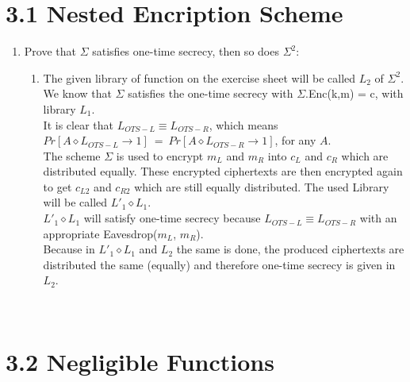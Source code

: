 \documentclass{report}
\begin{document}
	\pagestyle{fancy}
	
	\section*{3.1 Nested Encription Scheme}
	\begin{enumerate}[]
		\item Prove that $\Sigma$ satisfies one-time secrecy, then so does $\Sigma ^2$:
		\begin{enumerate}[]
			\item The given library of function on the exercise sheet will be called $L_2$ of $\Sigma ^2$. \\
			We know that $\Sigma$ satisfies the one-time secrecy with $\Sigma$.Enc(k,m) = c, with library $L_1$. \\
			It is clear that $L_{OTS-L} \equiv L_{OTS-R}$, which means $Pr[A \diamond L_{OTS-L} \rightarrow 1] \ = \ Pr[A \diamond L_{OTS-R} \rightarrow 1]$, for any $A$. \\
			The scheme $\Sigma$ is used to encrypt $m_L$ and $m_R$ into $c_L$ and $c_R$ which are distributed equally. These encrypted ciphertexts are then encrypted again to get $c_{L2}$ and $c_{R2}$ which are still equally distributed. The used Library will be called $L'_1 \diamond L_1$. \\
			$L'_1 \diamond L_1$ will satisfy one-time secrecy because $L_{OTS-L} \equiv L_{OTS-R}$ with an appropriate Eavesdrop($m_L$, $m_R$). \\
			Because in $L'_1 \diamond L_1$ and $L_2$ the same is done, the produced ciphertexts are distributed the same (equally) and therefore one-time secrecy is given in $L_2$.
		\end{enumerate}
	\end{enumerate}
	\hfill \\
	\section*{3.2 Negligible Functions}
\end{document}
